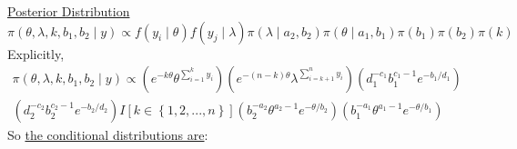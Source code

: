 \documentclass[lecture,12pt,]{pcms-l}
\numberwithin{section}{chapter}
\numberwithin{equation}{chapter}
\theoremstyle{plain}
\theoremstyle{definition}
\theoremstyle{definition}
\begin{document}
\underline{Posterior Distribution}
\begin{equation*}
\pi(\theta,\lambda,k,b_1,b_2 \mid y) \propto f(y_i \mid \theta)f(y_j \mid \lambda)\pi(\lambda \mid a_2,b_2)\pi(\theta \mid a_1,b_1)\pi(b_1)\pi(b_2)\pi(k)
\end{equation*}
Explicitly,
\begin{equation*}
\begin{split}
\pi(\theta,\lambda,k,b_1,b_2 \mid y)  \propto (e^{-k\theta} \theta^{\sum_{i=1}^k y_i})(e^{-(n-k)\theta} \lambda^{\sum_{i=k+1}^n y_i})(d_{1}^{-c_1} b_{1}^{c_1 -1}e^{-b_1/d_1})
\\
(d_{2}^{-c_2} b_{2}^{c_2 -1}e^{-b_2/d_2})I \left [ k \in \left \{ 1,2,...,n \right \} \right ](b_{2}^{-a_2} \theta^{a_2 -1}e^{-\theta/b_2})(b_{1}^{-a_1} \theta^{a_1 -1}e^{-\theta/b_1})
\end{split}
\end{equation*}
So \underline{the conditional distributions are}:
\end{document}
